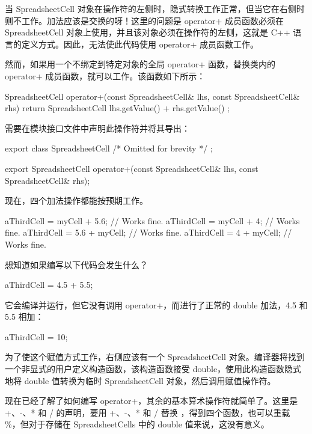 当 SpreadsheetCell 对象在操作符的左侧时，隐式转换工作正常，但当它在右侧时则不工作。加法应该是交换的呀！这里的问题是 operator+ 成员函数必须在 SpreadsheetCell 对象上使用，并且该对象必须在操作符的左侧，这就是 C++ 语言的定义方式。因此，无法使此代码使用 operator+ 成员函数工作。

然而，如果用一个不绑定到特定对象的全局 operator+ 函数，替换类内的 operator+ 成员函数，就可以工作。该函数如下所示：

\begin{cpp}
SpreadsheetCell operator+(const SpreadsheetCell& lhs,
    const SpreadsheetCell& rhs)
{
    return SpreadsheetCell { lhs.getValue() + rhs.getValue() };
}
\end{cpp}

需要在模块接口文件中声明此操作符并将其导出：

\begin{cpp}
export class SpreadsheetCell { /* Omitted for brevity */ };

export SpreadsheetCell operator+(const SpreadsheetCell& lhs,
    const SpreadsheetCell& rhs);
\end{cpp}

现在，四个加法操作都能按预期工作。

\begin{cpp}
aThirdCell = myCell + 5.6; // Works fine.
aThirdCell = myCell + 4; // Works fine.
aThirdCell = 5.6 + myCell; // Works fine.
aThirdCell = 4 + myCell; // Works fine.
\end{cpp}

想知道如果编写以下代码会发生什么？

\begin{cpp}
aThirdCell = 4.5 + 5.5;
\end{cpp}

它会编译并运行，但它没有调用 operator+，而进行了正常的 double 加法，4.5 和 5.5 相加：

\begin{cpp}
aThirdCell = 10;
\end{cpp}

为了使这个赋值方式工作，右侧应该有一个 SpreadsheetCell 对象。编译器将找到一个非显式的用户定义构造函数，该构造函数接受 double，使用此构造函数隐式地将 double 值转换为临时 SpreadsheetCell 对象，然后调用赋值操作符。


现在已经了解了如何编写 operator+，其余的基本算术操作符就简单了。这里是 +、-、* 和 / 的声明，要用 +、-、* 和 / 替换 ，得到四个函数，也可以重载 \%，但对于存储在 SpreadsheetCells 中的 double 值来说，这没有意义。

